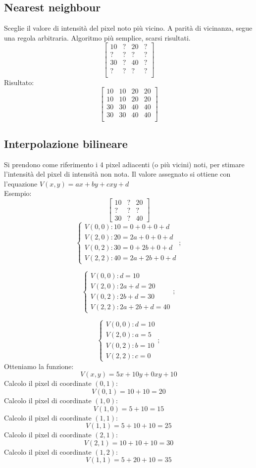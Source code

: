 \documentclass{report}
\begin{document}
\subsection{Nearest neighbour}
Sceglie il valore di intensità del pixel noto più vicino. A parità di vicinanza, segue una regola arbitraria. Algoritmo più semplice, scarsi risultati.
$$
\begin{bmatrix}
	10 & ? & 20 & ? \\
	?  & ? & ?  & ? \\
	30 & ? & 40 & ? \\
	?  & ? & ?  & ? \\
\end{bmatrix}
$$
Risultato:
$$
\begin{bmatrix}
	10 & 10 & 20 & 20 \\
	10 & 10 & 20 & 20 \\
	30 & 30 & 40 & 40 \\
	30 & 30 & 40 & 40 \\
\end{bmatrix}
$$
\subsection{Interpolazione bilineare}
Si prendono come riferimento i 4 pixel adiacenti (o più vicini) noti, per stimare l'intensità del pixel di intensità non nota.
Il valore assegnato si ottiene con l'equazione $V(x,y) = ax + by + cxy +d$\\
Esempio:
$$
\begin{bmatrix}
	10 & ? & 20 \\
	?  & ? & ?  \\
	30 & ? & 40 
\end{bmatrix}
$$
$$
\begin{cases}
	V(0,0): 10 = 0 + 0 + 0 + d   \\
	V(2,0): 20 = 2a + 0 + 0 + d  \\
	V(0,2): 30 = 0 + 2b + 0 + d  \\
	V(2,2): 40 = 2a + 2b + 0 + d 
\end{cases};
$$

$$
\begin{cases}
	V(0,0): d = 10           \\
	V(2,0): 2a + d = 20      \\
	V(0,2): 2b + d = 30      \\
	V(2,2): 2a + 2b + d = 40 
\end{cases};
$$

$$
\begin{cases}
	V(0,0): d = 10 \\
	V(2,0): a = 5  \\
	V(0,2): b = 10 \\
	V(2,2): c = 0  
\end{cases};
$$
Otteniamo la funzione:
$$
V(x,y) = 5x + 10y + 0xy + 10
$$
Calcolo il pixel di coordinate $(0, 1)$:
$$
V(0,1) = 10 + 10 = 20 
$$
Calcolo il pixel di coordinate $(1, 0)$:
$$
V(1,0) = 5 + 10 = 15
$$
Calcolo il pixel di coordinate $(1, 1)$:
$$
V(1,1) = 5 + 10 + 10 = 25 
$$
Calcolo il pixel di coordinate $(2, 1)$:
$$
V(2,1) = 10 + 10 + 10 = 30 
$$
Calcolo il pixel di coordinate $(1, 2)$:
$$
V(1,1) = 5 + 20 + 10 = 35 
$$
\end{document}
